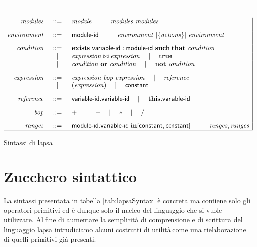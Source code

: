 \begin{table}[htbp!]
$$\begin{array}{|rcl|}
	\\[.3cm]
	\mathit{modules} &::=& \mathit{module} \quad\mid\quad \mathit{modules} \mbox{ } \mathit{modules}
	\\[.3cm]
	\mathit{environment} &::=& {\sf module}\textrm{-}{\sf id} \quad\mid\quad \mathit{environment} \mbox{ }|{\{\mathit{actions}\}}|\mbox{ } \mathit{environment}
	\\[.3cm]
	\mathit{condition} &::=& \mathbf{exists} \mbox{ } {\sf variable}\textrm{-}{\sf id}:{\sf module}\textrm{-}{\sf id} \mbox{ } \mathbf{such}\mbox{ }\mathbf{that} \mbox{ } \mathit{condition} \\
		& \quad\mid\quad & \mathit{expression} \bowtie \mathit{expression} \quad\mid\quad \mathbf{true} \\
		& \quad\mid\quad & \mathit{condition} \mbox{ } \mathbf{or} \mbox{ } \mathit{condition} \quad\mid\quad \mathbf{not} \mbox{ } \mathit{condition}
	\\[.3cm]
	\mathit{expression} &::=& \mathit{expression} \mbox{ } \mathit{bop} \mbox{ } \mathit{expression} \quad\mid\quad \mathit{reference} \\
	& \quad\mid\quad & (\mathit{expression}) \quad\mid\quad {\sf constant}
	\\[.3cm]
	\mathit{reference} &::=& {\sf variable}\textrm{-}{\sf id}\mathbf{.}{\sf variable}\textrm{-}{\sf id} \quad\mid\quad \mathbf{this}\mathbf{.}{\sf variable}\textrm{-}{\sf id}
	\\[.3cm]
	\mathit{bop} &::=& + \quad\mid\quad - \quad\mid\quad * \quad\mid\quad \slash
	\\[.3cm]
	\mathit{ranges} &::=& {\sf module}\textrm{-}{\sf id}\mathbf{.}{\sf variable}\textrm{-}{\sf id} \mbox{ } \mathbf{in} [{\sf constant}, {\sf constant}] \quad\mid\quad \mathit{ranges}, \mathit{ranges} 
	\\
	\hline
	\end{array}
$$
\caption{Sintassi di \ac{lapsa}}
\label{tab:lapsaSyntax}
\end{table}

\section{Zucchero sintattico}
La sintassi presentata in tabella \ref{tab:lapsaSyntax} è concreta ma contiene solo gli operatori primitivi ed è dunque solo il nucleo del linguaggio che si vuole utilizzare. Al fine di aumentare la semplicità di comprensione e di scrittura del linguaggio \ac{lapsa} intrudiciamo alcuni costrutti di utilità come una rielaborazione di quelli primitivi già presenti.

